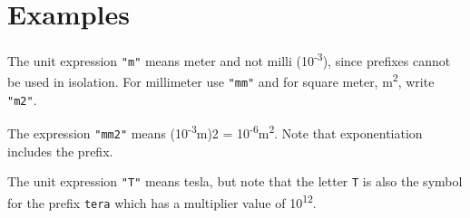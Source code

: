 \section{Examples}

The unit expression \lstinline!"m"! means meter and not milli
(10\textsuperscript{-3}), since prefixes cannot be used in isolation.
For millimeter use \lstinline!"mm"! and for square meter, m\textsuperscript{2}, write
\lstinline!"m2"!.

The expression \lstinline!"mm2"! means (10\textsuperscript{-3}m)2 =
10\textsuperscript{-6}m\textsuperscript{2}. Note that exponentiation
includes the prefix.

The unit expression \lstinline!"T"! means tesla, but note that the letter \lstinline!T! is
also the symbol for the prefix \lstinline!tera! which has a multiplier value of
10\textsuperscript{12}.
